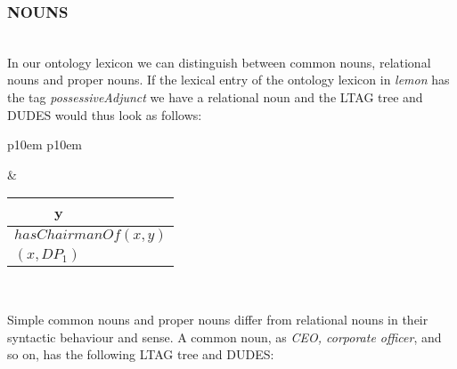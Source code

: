 \subsubsection{NOUNS}\mbox{}\\
In our ontology lexicon we can distinguish between common nouns, relational nouns and proper nouns. If the lexical entry of the ontology lexicon in \textit{lemon} has the tag \textit{possessiveAdjunct} we have a relational noun and the LTAG tree and DUDES would thus look as follows: 

\medskip
\begin{center}
\begin{tabular}{ p{10em} p{10em} }
	\label{tbl:grammar.chairmanOf}
	
	\begin{center}
		\begin{tikzpicture}
		\Tree [.NP [.N chairman ] [.PP [.P of ] DP$_1\downarrow$ ] ]
		\end{tikzpicture}
	\end{center}
		
	&
	
	\begin{center}
		\begin{tabular}{|c|l|}
			\hline
			y & \mbox{}\\ 
			\hline
			\multicolumn{2}{|l|}{
				$hasChairmanOf(x,y)$
			} \\
			\hline
			\multicolumn{2}{|l|}{
				$(x,DP_{1})$
			} \\
			\hline
		\end{tabular}
	\end{center}	
	\\
\end{tabular}
\end{center}
\medskip

Simple common nouns and proper nouns differ from relational nouns in their syntactic behaviour and sense. A common noun, as \textit{CEO, corporate officer}, and so on, has the following LTAG tree and DUDES:

